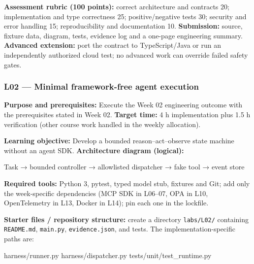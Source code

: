 \documentclass[
  10pt,
]{article}
\newenvironment{Shaded}{\begin{snugshade}}{\end{snugshade}}
\newcommand{\NormalTok}[1]{#1}
\begin{document}
\textbf{Assessment rubric (100 points):} correct architecture and
contracts 20; implementation and type correctness 25; positive/negative
tests 30; security and error handling 15; reproducibility and
documentation 10. \textbf{Submission:} source, fixture data, diagram,
tests, evidence log and a one-page engineering summary. \textbf{Advanced
extension:} port the contract to TypeScript/Java or run an independently
authorized cloud test; no advanced work can override failed safety
gates.

\subsubsection{L02 --- Minimal framework-free agent
execution}\label{l02-minimal-framework-free-agent-execution}

\textbf{Purpose and prerequisites:} Execute the Week 02 engineering
outcome with the prerequisites stated in Week 02. \textbf{Target time:}
4 h implementation plus 1.5 h verification (other course work handled in
the weekly allocation).

\textbf{Learning objective:} Develop a bounded reason--act--observe
state machine without an agent SDK. \textbf{Architecture diagram
(logical):}

\begin{Shaded}
\begin{Highlighting}[]
\NormalTok{Task → bounded controller → allowlisted dispatcher →}
\NormalTok{fake tool → event store}
\end{Highlighting}
\end{Shaded}

\textbf{Required tools:} Python 3, pytest, typed model stub, fixtures
and Git; add only the week-specific dependencies (MCP SDK in L06--07,
OPA in L10, OpenTelemetry in L13, Docker in L14); pin each one in the
lockfile.

{\raggedright \textbf{Starter files / repository structure:} create a directory
\texttt{labs/\allowbreak L02/} containing \texttt{README.md}, \texttt{main.py},
\texttt{evidence.json}, and tests. The implementation-specific paths
are:\par}

\begin{Shaded}
\begin{Highlighting}[]
\NormalTok{harness/runner.py}
\NormalTok{harness/dispatcher.py}
\NormalTok{tests/unit/test\_runtime.py}
\end{Highlighting}
\end{Shaded}
\end{document}
